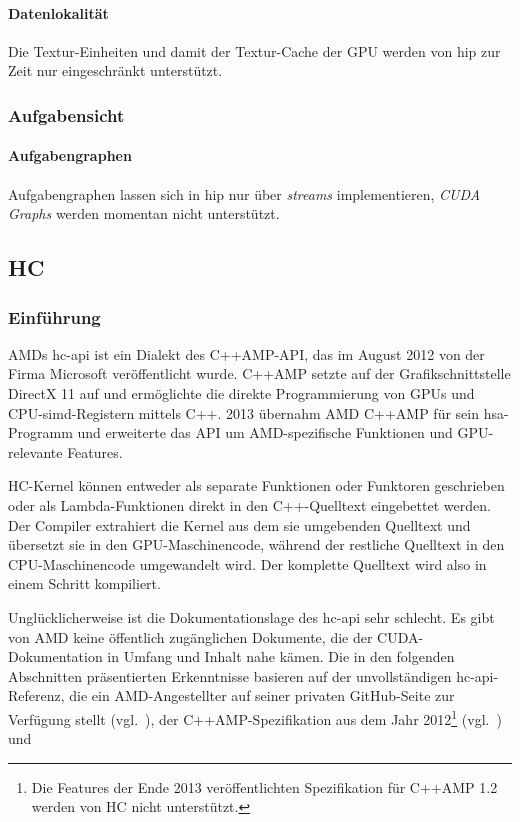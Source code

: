 \paragraph{Datenlokalität}

Die Textur-Einheiten und damit der Textur-Cache der GPU werden von \gls{hip} zur
Zeit nur eingeschränkt unterstützt.

\subsubsection{Aufgabensicht}

\paragraph{Aufgabengraphen}

Aufgabengraphen lassen sich in \gls{hip} nur über \textit{streams}
implementieren, \textit{CUDA Graphs} werden momentan nicht unterstützt.

\subsection{HC}
\label{vergleich:hc}

\subsubsection{Einführung}

AMDs \gls{hc}-\gls{api} ist ein Dialekt des C++AMP-API, das im August 2012 von
der Firma Microsoft veröffentlicht wurde. C++AMP setzte auf der
Grafikschnittstelle DirectX 11 auf und ermöglichte die direkte Programmierung
von GPUs und CPU-\gls{simd}-Registern mittels C++. 2013 übernahm AMD C++AMP
für sein \gls{hsa}-Programm und erweiterte das API um AMD-spezifische Funktionen
und GPU-relevante Features.

HC-Kernel können entweder als separate Funktionen oder Funktoren geschrieben 
oder als Lambda-Funktionen direkt in den C++-Quelltext eingebettet werden. Der
Compiler extrahiert die Kernel aus dem sie umgebenden Quelltext und übersetzt
sie in den GPU-Maschinencode, während der restliche Quelltext in den
CPU-Maschinencode umgewandelt wird. Der komplette Quelltext wird also in einem
Schritt kompiliert.

Unglücklicherweise ist die Dokumentationslage des \gls{hc}-\gls{api} sehr
schlecht. Es gibt von AMD keine öffentlich zugänglichen Dokumente, die der
CUDA-Dokumentation in Umfang und Inhalt nahe kämen. Die in den folgenden
Abschnitten präsentierten Erkenntnisse basieren auf der unvollständigen
\gls{hc}-\gls{api}-Referenz, die ein AMD-Angestellter auf seiner privaten
GitHub-Seite zur Verfügung stellt (vgl.~\cite{hcref}), der C++AMP-Spezifikation
aus dem Jahr 2012\footnote{Die Features der Ende 2013 veröffentlichten
Spezifikation für C++AMP 1.2 werden von HC nicht unterstützt.}
(vgl.~\cite{cppamp2012}) und

